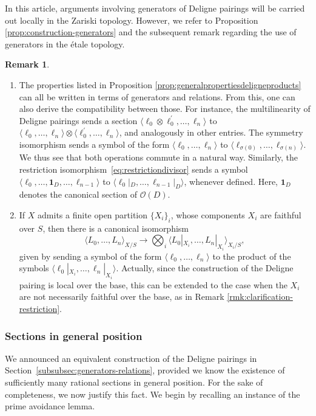 \documentclass[JEP,XML,SOM,Unicode,published]{cedram}
\theoremstyle{plain}
\theoremstyle{definition}
\newtheorem{remark}[theorem]{Remark}
\newcommand{\Ocal}{\mathcal O}
\begin{document}
In this article, arguments involving generators of Deligne pairings will be carried out locally in the Zariski topology. However, we refer to Proposition \ref{prop:construction-generators} and the subsequent remark regarding the use of generators in the étale topology.

\skpt
\begin{remark}
\begin{enumerate}
\item The properties listed in Proposition \ref{prop:generalpropertiesdeligneproducts} can all be written in terms of generators and relations. From this, one can also derive the compatibility between those. For instance, the multilinearity of Deligne pairings sends a section $\langle \ell_0\otimes\ell_{0}^{\prime}, \ldots, \ell_n \rangle $ to $\langle \ell_0, \ldots, \ell_n \rangle \otimes \langle \ell_0^{\prime}, \ldots, \ell_n \rangle$, and analogously in other entries. The symmetry isomorphism sends a symbol of the form $\langle \ell_0, \ldots, \ell_n \rangle $ to $\langle \ell_{\sigma(0)}, \ldots, \ell_{\sigma(n)} \rangle $. We thus see that both operations commute in a natural way. Similarly, the restriction isomorphism~\eqref{eq:restrictiondivisor} sends a symbol $\langle \ell_0, \ldots, \mathbf{1}_{D},\ldots, \ell_{n-1} \rangle$ to $\langle \ell_0 |_{D}, \ldots, \ell_{n-1} |_{D} \rangle$, whenever defined. Here, $\mathbf{1}_{D}$ denotes the canonical section of $\Ocal(D)$.
\item If $X$ admits a finite open partition $\lbrace X_{i}\rbrace_{i}$, whose components $X_{i}$ are faithful over $S$, then there is a canonical isomorphism
\begin{equation}\label{eq:decomposition-Deligne-pairing-partition}
\langle L_{0},\ldots, L_{n}\rangle_{X/S}\to\bigotimes_{i}\langle L_{0} |_{X_{i}},\ldots, L_{n} |_{X_{i}}\rangle_{X_{i}/S},
\end{equation}
given by sending a symbol of the form $\langle \ell_{0}, \ldots, \ell_{n} \rangle $ to the product of the symbols $\langle \ell_{0} |_{X_{i}}, \ldots, \ell_{n} |_{X_{i}} \rangle$. Actually, since the construction of the Deligne pairing is local over the base, this can be extended to the case when the $X_{i}$ are not necessarily faithful over the base, as in Remark \ref{rmk:clarification-restriction}.
\end{enumerate}
\end{remark}

\subsubsection{Sections in general position}\label{subsubsec:sections-general-position}
We announced an equivalent construction of the Deligne pairings in Section~\ref{subsubsec:generators-relations}, provided we know the existence of sufficiently many rational sections in general position. For the sake of completeness, we now justify this fact. We begin by recalling an instance of the prime avoidance lemma.
\end{document}
